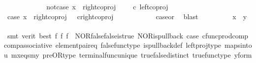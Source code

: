 \begin{isabellebody}
\ \ \ \ \isamarkupfalse%
\isanewline
\ \ \ \ \ \ \isamarkupfalse%
\ not{\isacharunderscore}{\kern0pt}case{}{\isacharcolon}{\kern0pt}\ {\isachardoublequoteopen}x\ {\isasymnoteq}\ right{\isacharunderscore}{\kern0pt}coproj\ {\isasymone}\ {\isacharparenleft}{\kern0pt}{\isasymone}\ {\isasymCoprod}\ {\isasymone}{\isacharparenright}{\kern0pt}\ {\isasymcirc}\isactrlsub c\ left{\isacharunderscore}{\kern0pt}coproj\ {\isasymone}\ {\isasymone}{\isachardoublequoteclose}\isanewline
\ \ \ \ \ \ \isamarkupfalse%
\ \isamarkupfalse%
\ case{}{\isacharcolon}{\kern0pt}\ {\isachardoublequoteopen}x\ {\isacharequal}{\kern0pt}\ right{\isacharunderscore}{\kern0pt}coproj\ {\isasymone}\ {\isacharparenleft}{\kern0pt}{\isasymone}{\isasymCoprod}{\isasymone}{\isacharparenright}{\kern0pt}\ {\isasymcirc}\isactrlsub c{\isacharparenleft}{\kern0pt}right{\isacharunderscore}{\kern0pt}coproj\ {\isasymone}\ {\isasymone}{\isacharparenright}{\kern0pt}{\isachardoublequoteclose}\isanewline
\ \ \ \ \ \ \ \ \isamarkupfalse%
\ case{}{\isacharunderscore}{\kern0pt}or{\isacharunderscore}{\kern0pt}{}\ \isamarkupfalse%
\ blast\isanewline
\ \ \ \ \ \ \isamarkupfalse%
\ \isamarkupfalse%
\ {\isachardoublequoteopen}x\ {\isacharequal}{\kern0pt}\ y{\isachardoublequoteclose}\isanewline
\ \ \ \ \ \ \ \ \isamarkupfalse%
\ {\isacharparenleft}{\kern0pt}smt\ {\isacharparenleft}{\kern0pt}verit{\isacharcomma}{\kern0pt}\ best{\isacharparenright}{\kern0pt}\ f{}\ f{}\ f{}\ \ NOR{\isacharunderscore}{\kern0pt}false{\isacharunderscore}{\kern0pt}false{\isacharunderscore}{\kern0pt}is{\isacharunderscore}{\kern0pt}true\ NOR{\isacharunderscore}{\kern0pt}is{\isacharunderscore}{\kern0pt}pullback\ case{}\ cfunc{\isacharunderscore}{\kern0pt}prod{\isacharunderscore}{\kern0pt}comp\ comp{\isacharunderscore}{\kern0pt}associative{}\ element{\isacharunderscore}{\kern0pt}pair{\isacharunderscore}{\kern0pt}eq\ false{\isacharunderscore}{\kern0pt}func{\isacharunderscore}{\kern0pt}type\ is{\isacharunderscore}{\kern0pt}pullback{\isacharunderscore}{\kern0pt}def\ left{\isacharunderscore}{\kern0pt}proj{\isacharunderscore}{\kern0pt}type\ maps{\isacharunderscore}{\kern0pt}into{\isacharunderscore}{\kern0pt}{}u{}\ mx{\isacharunderscore}{\kern0pt}eqs{\isacharunderscore}{\kern0pt}my\ pre{\isacharunderscore}{\kern0pt}OR{\isacharunderscore}{\kern0pt}type\ terminal{\isacharunderscore}{\kern0pt}func{\isacharunderscore}{\kern0pt}unique\ true{\isacharunderscore}{\kern0pt}false{\isacharunderscore}{\kern0pt}distinct\ true{\isacharunderscore}{\kern0pt}func{\isacharunderscore}{\kern0pt}type\ y{\isacharunderscore}{\kern0pt}form{\isacharparenright}{\kern0pt}\isanewline

\end{isabellebody}
